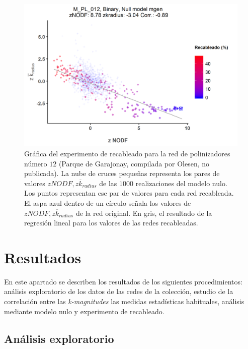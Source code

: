 \begin{figure}[h!]
\centering
\includegraphics[scale=0.75]{Figures/ESTATICA_z_M_PL_012_rewire_Binary_ES_model_5.png}
\caption {Gráfica del experimento de recableado para la red de polinizadores número $12$ (Parque de Garajonay, compilada por Olesen, no publicada). La nube de cruces pequeñas representa los pares de valores $zNODF,z\overline k_{radius}$ de las $1000$ realizaciones del modelo nulo. Los puntos representan ese par de valores para cada red recableada. El aspa azul dentro de un círculo señala los valores de $zNODF,z\overline k_{radius}$ de la red original. En gris, el resultado de la regresión lineal para los valores de las redes recableadas.}
\label{fig:z_M_PL_012_rewire_Binary_ES_model_5}
\end{figure}

\clearpage
\section{Resultados}

En este apartado se describen los resultados de los siguientes procedimientos: análisis exploratorio de los datos de las redes de la colección, estudio de la correlación entre las \textit{k-magnitudes} las medidas estadísticas habituales, análisis mediante modelo nulo y experimento de recableado.

\subsection{Análisis exploratorio}

